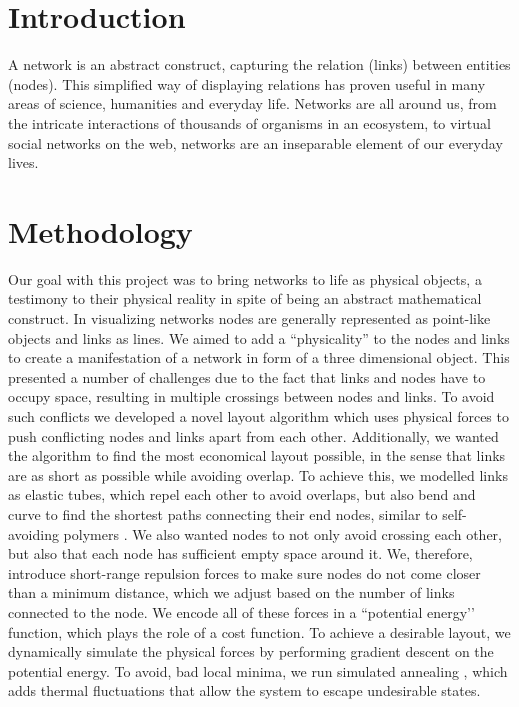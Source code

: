 \documentclass[12pt]{article}
\begin{document}
\section{Introduction}
A network is an abstract construct, capturing the relation (links) between entities (nodes).
This simplified way of displaying relations has proven useful in many areas of science, humanities and everyday life. 
Networks are all around us, from the intricate interactions of thousands of organisms in an ecosystem, to virtual social networks on the web, networks are an inseparable element of our everyday lives. 

\section{Methodology}
Our goal with this project was to bring networks to life as physical objects, a testimony to their physical reality in spite of being an abstract mathematical construct. 
In visualizing networks nodes are generally represented as point-like objects and links as lines.  
We aimed to add a “physicality” to the nodes and links to create a manifestation of a network in form of a three dimensional object. 
This presented a number of challenges due to the fact that links and nodes have to occupy space, resulting in multiple crossings between nodes and links. 
To avoid such conflicts we developed a novel layout algorithm which uses physical forces to push conflicting nodes and links apart from each other.
Additionally, we wanted the algorithm to find the most economical layout possible, in the sense that links are as short as possible while avoiding overlap. 
To achieve this, we modelled links as elastic tubes, which repel each other to avoid overlaps, but also bend and curve to find the shortest paths connecting their end nodes, similar to self-avoiding polymers \cite{des1974lagrangian}.
We also wanted nodes to not only avoid crossing each other, but also that each node has sufficient empty space around it. 
We, therefore, introduce short-range repulsion forces to make sure nodes do not come closer than a minimum distance, which we adjust based on the number of links connected to the node. 
We encode all of these forces in a ``potential energy’’ function, which plays the role of a cost function. 
To achieve a desirable layout, we dynamically simulate the physical forces by performing gradient descent on the potential energy. 
To avoid, bad local minima, we run simulated annealing \cite{kirkpatrick1987optimization}, which adds thermal fluctuations that allow the system to escape undesirable states. 
\end{document}
